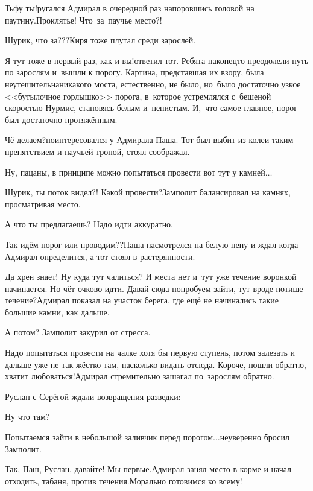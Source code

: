 \diagdash Тьфу ты!\mdash ругался Адмирал в очередной раз напоровшись головой на паутину.\mdash Проклятье! Что~за~паучье место?!

\diagdash Шурик, что за???\mdash Киря тоже плутал среди зарослей.

\diagdash Я тут тоже в первый раз, как и вы!\mdash ответил тот. Ребята наконец\sdash то преодолели путь по зарослям и~вышли к порогу. Картина, представшая их взору, была неутешительна\mdash никакого моста, естественно, не было, но~было достаточно узкое <<бутылочное горлышко>> порога, в~которое устремлялся с~бешеной скоростью Нурмис, становясь белым и~пенистым. И,~что самое главное, порог был достаточно протяжённым. 

\diagdash Чё делаем?\mdash поинтересовался у Адмирала Паша. Тот был выбит из колеи таким препятствием и паучьей тропой, стоял соображал.

\diagdash Ну, пацаны, в принципе можно попытаться провести вот тут у камней$\ldots$

\diagdash Шурик, ты поток видел?! Какой провести?\mdash Замполит балансировал на камнях, просматривая место.

\diagdash А что ты предлагаешь? Надо идти аккуратно. 

\diagdash Так идём порог или проводим??\mdash Паша насмотрелся на белую пену и ждал когда Адмирал определится, а тот стоял в растерянности. 

\diagdash Да хрен знает! Ну куда тут чалиться? И места нет и~тут уже течение воронкой начинается. Но чёт очково идти. Давай сюда попробуем зайти, тут вроде потише течение?\mdash Адмирал показал на участок берега, где ещё не начинались такие большие камни, как дальше. 

\diagdash А потом? \mdash Замполит закурил от стресса.

\diagdash Надо попытаться провести на чалке хотя бы первую ступень, потом залезать и дальше уже не так жёстко там, насколько видать отсюда. Короче, пошли обратно, хватит любоваться!\mdash Адмирал стремительно зашагал по~зарослям обратно.

Руслан с Серёгой ждали возвращения разведки:

\diagdash Ну что там?

\diagdash Попытаемся зайти в небольшой заливчик перед порогом$\ldots$\mdash неуверенно бросил Замполит.

\diagdash Так, Паш, Руслан, давайте! Мы первые.\mdash Адмирал занял место в корме и начал отходить, табаня, против течения.\mdash Морально готовимся ко всему!

